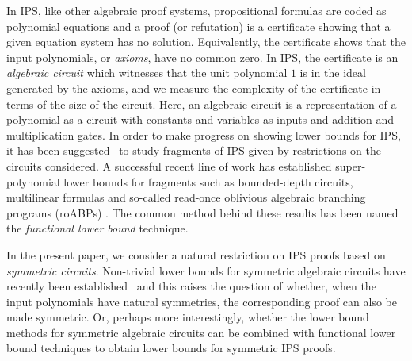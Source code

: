 \documentclass[a4paper,UKenglish,cleveref, autoref, thm-restate]{lipics-v2021}
\begin{document}
	In IPS, like other algebraic proof systems, propositional formulas are coded as polynomial equations and a proof (or refutation) is a certificate showing that a given equation system has no solution.  Equivalently, the certificate shows that the input polynomials, or \emph{axioms}, have no common zero. In IPS, the certificate is an \emph{algebraic circuit} which witnesses that the unit polynomial $1$ is in the ideal generated by the axioms, and we measure the complexity of the certificate in terms of the size of the circuit.  Here, an algebraic circuit is a representation of a polynomial as a circuit with constants and variables as inputs and addition and multiplication gates. In order to make progress on showing lower bounds for IPS, it has been suggested~\cite{IPS} to study fragments of IPS given by restrictions on the circuits considered.
	A successful recent line of work has established super-polynomial lower bounds for fragments such as bounded-depth circuits, multilinear formulas and so-called read-once oblivious algebraic branching programs (roABPs) \cite{lowerbounds_IPS, limaye2021new, govindasamy2022simple, hakoniemi2024functional}. The common method behind these results has been named the \emph{functional lower bound} technique.
	
	In the present paper, we consider a natural restriction on IPS proofs based on \emph{symmetric circuits}. Non-trivial lower bounds for symmetric algebraic circuits have recently been established~\cite{DawarW20,DawarW22,DawarPS25} and this raises the question of whether, when the input polynomials have natural symmetries, the corresponding proof can also be made symmetric.  Or, perhaps more interestingly, whether the lower bound methods for symmetric algebraic circuits can be combined with functional lower bound techniques to obtain lower bounds for symmetric IPS proofs.
	
\end{document}
